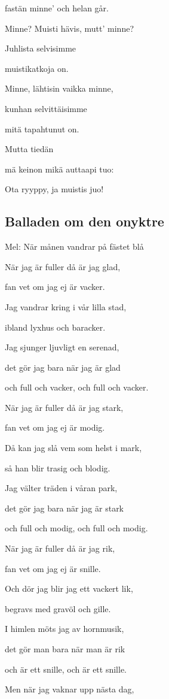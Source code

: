 fastän minne’ och helan går.

Minne? Muisti hävis, mutt’ minne?

Juhlista selvisimme

muistikatkoja on.

Minne, lähtisin vaikka minne,

kunhan selvittäisimme

mitä tapahtunut on.

Mutta tiedän

mä keinon mikä auttaapi tuo:

Ota ryyppy, ja muistis juo! 

\subsection{\textbf{Balladen om den onyktre}}

Mel: När månen vandrar på fästet blå\bigskip


När jag är fuller då är jag glad,

fan vet om jag ej är vacker.

Jag vandrar kring i vår lilla stad,

ibland lyxhus och baracker.

Jag sjunger ljuvligt en serenad,

det gör jag bara när jag är glad

och full och vacker, och full och vacker. \bigskip


När jag är fuller då är jag stark,

fan vet om jag ej är modig.

Då kan jag slå vem som helst i mark,

så han blir trasig och blodig.

Jag välter träden i våran park,

det gör jag bara när jag är stark

och full och modig, och full och modig. \bigskip


När jag är fuller då är jag rik,

fan vet om jag ej är snille.

Och dör jag blir jag ett vackert lik,

begravs med gravöl och gille.

I himlen möts jag av hornmusik,

det gör man bara när man är rik

och är ett snille, och är ett snille. \bigskip


Men när jag vaknar upp nästa dag,


